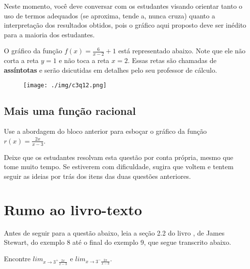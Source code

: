 \documentclass[main_estudante.tex]{subfiles}
\begin{document}
\paraTutores

Neste momento, você deve conversar com os estudantes visando orientar tanto o uso de termos adequados (se aproxima, tende a, nunca cruza) quanto a interpretação dos resultados obtidos, pois o gráfico aqui proposto deve ser inédito para a maioria dos estudantes.

\paraAmbos
\newpage

O gráfico da função $f(x)=\frac{6}{x-2}+1$ está representado abaixo. Note que ele não corta a reta $y=1$ e não toca a reta $x=2$. Essas retas são chamadas de \textbf{assíntotas} e serão dsicutidas em detalhes pelo seu professor de cálculo.

\begin{figure}[h]
\centering
\texttt{[image: ./img/c3q12.png]}
\end{figure}

\subsection*{Mais uma função racional}

\begin{questao}
Use a abordagem do bloco anterior para esboçar o gráfico da função $r(x)=\frac{2x}{x-3}$.
\end{questao}
\newpage

\paraTutores

Deixe que os estudantes resolvam esta questão por conta própria, mesmo que tome muito tempo. Se estiverem com dificuldade, sugira que voltem e tentem seguir as ideias por trás dos itens das duas questões anteriores.

\paraAmbos

\section{Rumo ao livro-texto}

Antes de seguir para a questão abaixo, leia a seção 2.2 do livro , de James Stewart, do exemplo 8 até o final do exemplo 9, que segue transcrito abaixo.

\begin{resolvida}
Encontre $lim_{x\rightarrow3^+ \frac{2x}{x-3}}$ e $lim_{x\rightarrow3^- \frac{2x}{x-3}}$.
\end{resolvida}
\end{document}

